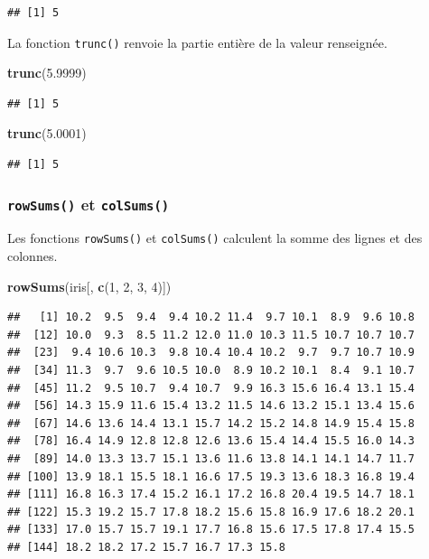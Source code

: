 \documentclass[twoside,symmetric]{book}
\newenvironment{Shaded}{}{}
\newcommand{\DecValTok}[1]{#1}
\newcommand{\FloatTok}[1]{#1}
\newcommand{\KeywordTok}[1]{\textbf{#1}}
\newcommand{\NormalTok}[1]{#1}
\begin{document}
\begin{verbatim}
## [1] 5
\end{verbatim}

La fonction \texttt{trunc()} renvoie la partie entière de la valeur renseignée.

\begin{Shaded}
\begin{Highlighting}[]
\KeywordTok{trunc}\NormalTok{(}\FloatTok{5.9999}\NormalTok{)}
\end{Highlighting}
\end{Shaded}

\begin{verbatim}
## [1] 5
\end{verbatim}

\begin{Shaded}
\begin{Highlighting}[]
\KeywordTok{trunc}\NormalTok{(}\FloatTok{5.0001}\NormalTok{)}
\end{Highlighting}
\end{Shaded}

\begin{verbatim}
## [1] 5
\end{verbatim}

\hypertarget{l015rowsums}{%
\subsubsection{\texorpdfstring{\texttt{rowSums()} et \texttt{colSums()}}{rowSums() et colSums()}}\label{l015rowsums}}

Les fonctions \texttt{rowSums()} et \texttt{colSums()} calculent la somme des lignes et des colonnes.

\begin{Shaded}
\begin{Highlighting}[]
\KeywordTok{rowSums}\NormalTok{(iris[, }\KeywordTok{c}\NormalTok{(}\DecValTok{1}\NormalTok{, }\DecValTok{2}\NormalTok{, }\DecValTok{3}\NormalTok{, }\DecValTok{4}\NormalTok{)])}
\end{Highlighting}
\end{Shaded}

\begin{verbatim}
##   [1] 10.2  9.5  9.4  9.4 10.2 11.4  9.7 10.1  8.9  9.6 10.8
##  [12] 10.0  9.3  8.5 11.2 12.0 11.0 10.3 11.5 10.7 10.7 10.7
##  [23]  9.4 10.6 10.3  9.8 10.4 10.4 10.2  9.7  9.7 10.7 10.9
##  [34] 11.3  9.7  9.6 10.5 10.0  8.9 10.2 10.1  8.4  9.1 10.7
##  [45] 11.2  9.5 10.7  9.4 10.7  9.9 16.3 15.6 16.4 13.1 15.4
##  [56] 14.3 15.9 11.6 15.4 13.2 11.5 14.6 13.2 15.1 13.4 15.6
##  [67] 14.6 13.6 14.4 13.1 15.7 14.2 15.2 14.8 14.9 15.4 15.8
##  [78] 16.4 14.9 12.8 12.8 12.6 13.6 15.4 14.4 15.5 16.0 14.3
##  [89] 14.0 13.3 13.7 15.1 13.6 11.6 13.8 14.1 14.1 14.7 11.7
## [100] 13.9 18.1 15.5 18.1 16.6 17.5 19.3 13.6 18.3 16.8 19.4
## [111] 16.8 16.3 17.4 15.2 16.1 17.2 16.8 20.4 19.5 14.7 18.1
## [122] 15.3 19.2 15.7 17.8 18.2 15.6 15.8 16.9 17.6 18.2 20.1
## [133] 17.0 15.7 15.7 19.1 17.7 16.8 15.6 17.5 17.8 17.4 15.5
## [144] 18.2 18.2 17.2 15.7 16.7 17.3 15.8
\end{verbatim}
\end{document}

